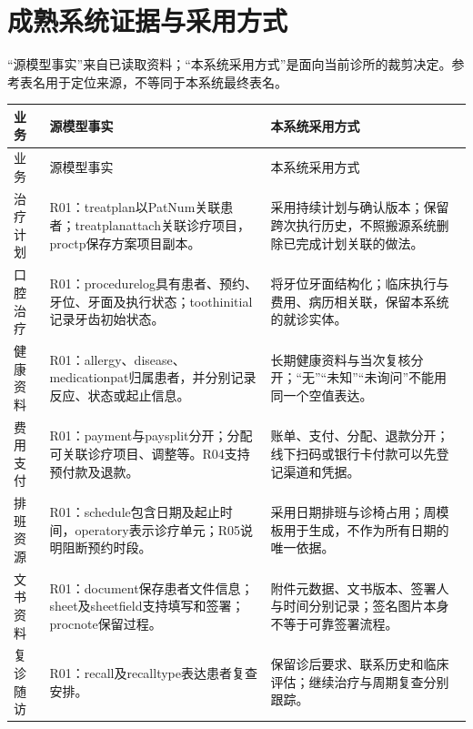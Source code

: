 \documentclass[UTF8,a4paper,zihao=-4,fontset=none]{ctexart}
\begin{document}
\clearpage\section{成熟系统证据与采用方式}
“源模型事实”来自已读取资料；“本系统采用方式”是面向当前诊所的裁剪决定。参考表名用于定位来源，不等同于本系统最终表名。

{\small
\begin{longtable}{@{}p{2.0cm}p{6.0cm}p{7.5cm}@{}}
\toprule
业务 & 源模型事实 & 本系统采用方式 \\ \midrule
\endfirsthead
\toprule
业务 & 源模型事实 & 本系统采用方式 \\ \midrule
\endhead
\raggedright\arraybackslash 治疗计划 & \raggedright\arraybackslash R01：treatplan以PatNum关联患者；treatplanattach关联诊疗项目，proctp保存方案项目副本。 & \raggedright\arraybackslash 采用持续计划与确认版本；保留跨次执行历史，不照搬源系统删除已完成计划关联的做法。 \\[4pt]
\raggedright\arraybackslash 口腔治疗 & \raggedright\arraybackslash R01：procedurelog具有患者、预约、牙位、牙面及执行状态；toothinitial记录牙齿初始状态。 & \raggedright\arraybackslash 将牙位牙面结构化；临床执行与费用、病历相关联，保留本系统的就诊实体。 \\[4pt]
\raggedright\arraybackslash 健康资料 & \raggedright\arraybackslash R01：allergy、disease、medicationpat归属患者，并分别记录反应、状态或起止信息。 & \raggedright\arraybackslash 长期健康资料与当次复核分开；“无”“未知”“未询问”不能用同一个空值表达。 \\[4pt]
\raggedright\arraybackslash 费用支付 & \raggedright\arraybackslash R01：payment与paysplit分开；分配可关联诊疗项目、调整等。R04支持预付款及退款。 & \raggedright\arraybackslash 账单、支付、分配、退款分开；线下扫码或银行卡付款可以先登记渠道和凭据。 \\[4pt]
\raggedright\arraybackslash 排班资源 & \raggedright\arraybackslash R01：schedule包含日期及起止时间，operatory表示诊疗单元；R05说明阻断预约时段。 & \raggedright\arraybackslash 采用日期排班与诊椅占用；周模板用于生成，不作为所有日期的唯一依据。 \\[4pt]
\raggedright\arraybackslash 文书资料 & \raggedright\arraybackslash R01：document保存患者文件信息；sheet及sheetfield支持填写和签署；procnote保留过程。 & \raggedright\arraybackslash 附件元数据、文书版本、签署人与时间分别记录；签名图片本身不等于可靠签署流程。 \\[4pt]
\raggedright\arraybackslash 复诊随访 & \raggedright\arraybackslash R01：recall及recalltype表达患者复查安排。 & \raggedright\arraybackslash 保留诊后要求、联系历史和临床评估；继续治疗与周期复查分别跟踪。 \\[4pt]

\end{longtable}}
\end{document}

